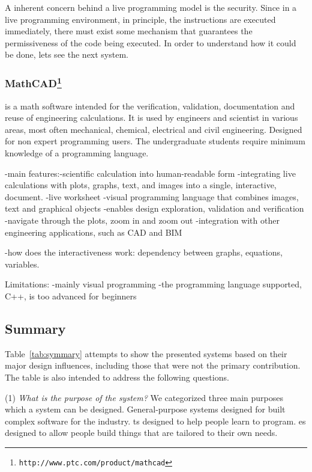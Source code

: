 A inherent concern behind a live programming model is the security. Since in a live programming environment, in principle, the instructions are executed immediately, there must exist some mechanism that guarantees the permissiveness of the code being executed. In order to understand how it could be done, lets see the next system. 
\subsubsection{MathCAD\protect\footnote{\texttt{http://www.ptc.com/product/mathcad}}} is a math software intended for the verification, validation, documentation and reuse of engineering calculations. It is used by engineers and scientist in various areas, most often mechanical, chemical, electrical and civil engineering. Designed for non expert programming users. The undergraduate students require minimum knowledge of a programming language.

-main features:-scientific calculation into human-readable form
			  -integrating live calculations with plots, graphs, text, and images into a single, interactive, document.
			  	-live worksheet
			  -visual programming language that combines images, text and graphical objects 
			  -enables design exploration, validation and verification
	 		  -navigate through the plots, zoom in and zoom out
			  -integration with other engineering applications, such as CAD and BIM

-how does the interactiveness work: dependency between graphs, equations, variables.

Limitations: -mainly visual programming
		     -the programming language supported, C++, is too advanced for beginners

\subsection{Summary}

Table~\ref{tab:symmary} attempts to show the presented systems based on their major design influences, including those that were not the primary contribution. The table is also intended to address the following questions.

(1) \textit{What is the purpose of the system?} We categorized three main purposes which a system can be designed. General-purpose systems designed for built complex software for the industry. \ac{ts} designed to help people learn to program. \ac{es} designed to allow people build things that are tailored to their own needs.

